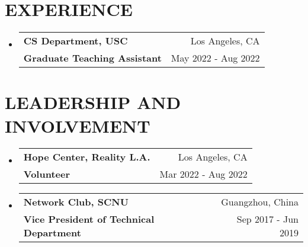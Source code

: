 \documentclass[letterpaper,11pt]{article}
\makeatletter
\newcommand{\resumeSubheading}[4]{
  \vspace{-1pt}\item
    \begin{tabular*}{0.97\textwidth}[t]{l@{\extracolsep{\fill}}r}
      \textbf{#1} & #2 \\
      \textbf{\small#3} & \small{#4} \\
    \end{tabular*}\vspace{-10pt}
}
\newcommand{\resumeSubHeadingListStart}{\begin{itemize}[leftmargin=*]}
\newcommand{\resumeSubHeadingListEnd}{\end{itemize}\vspace{-5pt}}
\makeatother
\begin{document}
\section{EXPERIENCE}
\resumeSubHeadingListStart
\resumeSubheading
    {CS Department, USC}{Los Angeles, CA}
    {Graduate Teaching Assistant}{May 2022 - Aug 2022}
\resumeSubHeadingListEnd



\section{LEADERSHIP AND INVOLVEMENT}
\resumeSubHeadingListStart
\resumeSubheading
    {Hope Center, Reality L.A.}{Los Angeles, CA}
    {Volunteer}{Mar 2022 - Aug 2022}
\resumeSubheading
    {Network Club, SCNU}{Guangzhou, China}
    {Vice President of Technical Department}{Sep 2017 - Jun 2019}
\resumeSubHeadingListEnd
\end{document}
